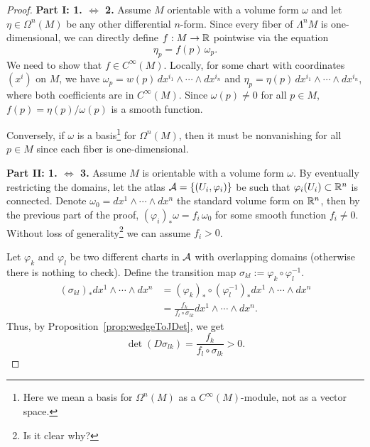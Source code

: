 \begin{proof}
  \textbf{Part I: 1. $\Leftrightarrow$ 2.}
  Assume $M$ orientable with a volume form $\omega$ and let $\eta\in\Omega^n(M)$ be any other differential $n$-form.
  Since every fiber of $\Lambda^n M$ is one-dimensional, we can directly define $f:M \to \mathbb{R}$ pointwise via the equation
  \[
    \eta_p = f(p)\,\omega_p.
  \]
  We need to show that $f\in C^\infty(M)$.
  Locally, for some chart with coordinates $(x^i)$ on $M$, we have $\omega_p = w(p)\, dx^{i_1}\wedge\cdots\wedge dx^{i_n}$ and $\eta_p = \eta(p)\, dx^{i_1}\wedge\cdots\wedge dx^{i_n}$, where both coefficients are in  $C^\infty(M)$.
  Since $\omega(p) \neq 0$ for all $p\in M$, $f(p) = \eta(p)/\omega(p)$ is a smooth function.

  Conversely, if $\omega$ is a basis\footnote{Here we mean a basis for $\Omega^n(M)$ as a $C^\infty(M)$-module, not as a vector space.} for $\Omega^n(M)$, then it must be nonvanishing for all $p\in M$ since each fiber is one-dimensional.
  \medskip

  \textbf{Part II: 1. $\Leftrightarrow$ 3.}
  Assume $M$ is orientable with a volume form $\omega$.
  By eventually restricting the domains, let the atlas $\mathcal{A} = \{(U_i, \varphi_i)\}$ be such that $\varphi_i(U_i) \subset \mathbb{R}^n$ is connected.
  Denote $\omega_0 = dx^1 \wedge\cdots\wedge dx^n$ the standard volume form on $\mathbb{R}^n$, then by the previous part of the proof, $(\varphi_i)_*\omega = f_i\,\omega_0$ for some smooth function $f_i \neq 0$.
  Without loss of generality\footnote{Is it clear why?} we can assume $f_i > 0$.

  Let $\varphi_k$ and $\varphi_l$ be two different charts in $\mathcal{A}$ with overlapping domains (otherwise there is nothing to check).
  Define the transition map $\sigma_{kl} := \varphi_k\circ\varphi_l^{-1}$.
  \begin{align}
    (\sigma_{kl})_* dx^1\wedge\cdots\wedge dx^n & = (\varphi_k)_* \circ (\varphi_l^{-1})_* dx^1\wedge \cdots\wedge dx^n \\
                                                & = \frac{f_k}{f_l \circ \sigma_{lk}} dx^1\wedge \cdots\wedge dx^n.
  \end{align}
  Thus, by Proposition~\ref{prop:wedgeToJDet}, we get
  \begin{equation}
    \det(D\sigma_{lk}) = \frac{f_k}{f_l \circ \sigma_{lk}} > 0.
  \end{equation}


\end{proof}
